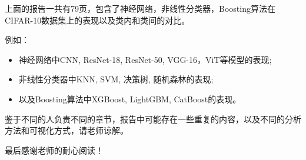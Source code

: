 \documentclass[UTF8]{report}
\theoremstyle{MyLineTheoremStyle} %
\theoremstyle{MyBlockTheoremStyle} %
\theoremstyle{MySubsubsectionStyle} %
\begin{document}
上面的报告一共有79页，包含了神经网络，非线性分类器，Boosting算法在CIFAR-10数据集上的表现以及类内和类间的对比。

例如：
\begin{itemize}
    \item 神经网络中CNN, ResNet-18, ResNet-50, VGG-16，ViT等模型的表现;
    \item 非线性分类器中KNN, SVM, 决策树, 随机森林的表现;
    \item 以及Boosting算法中XGBoost, LightGBM, CatBoost的表现。
\end{itemize}

鉴于不同的人负责不同的章节，报告中可能存在一些重复的内容，以及不同的分析方法和可视化方式，请老师谅解。

最后感谢老师的耐心阅读！
\end{document}

